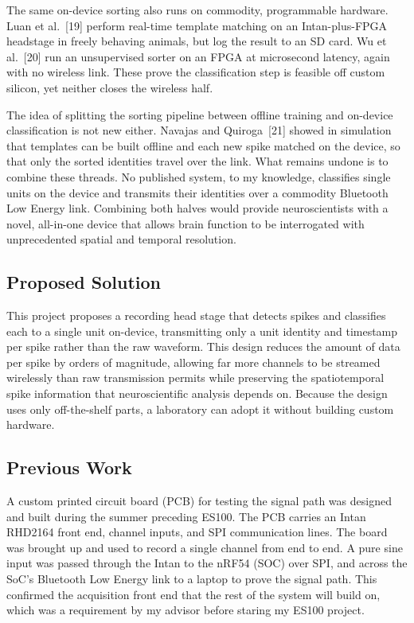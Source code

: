 \documentclass[11pt]{article}
\begin{document}
The same on-device sorting also runs on commodity, programmable hardware. Luan et al.~[19]
perform real-time template matching on an Intan-plus-FPGA headstage in freely behaving
animals, but log the result to an SD card. Wu et al.~[20] run an unsupervised sorter on an
FPGA at microsecond latency, again with no wireless link. These prove the classification
step is feasible off custom silicon, yet neither closes the wireless half.

The idea of splitting the sorting pipeline between offline training and on-device
classification is not new either. Navajas and Quiroga~[21] showed in simulation that
templates can be built offline and each new spike matched on the device, so that only the
sorted identities travel over the link. What remains undone is to combine these threads.
No published system, to my knowledge, classifies single units on the device and transmits
their identities over a commodity Bluetooth Low Energy link. Combining both halves would
provide neuroscientists with a novel, all-in-one device that allows brain function to be
interrogated with unprecedented spatial and temporal resolution.

\subsection{Proposed Solution}
This project proposes a recording head stage that detects spikes and classifies each to a
single unit on-device, transmitting only a unit identity and timestamp per spike
rather than the raw waveform. This design reduces the amount of data per spike by orders
of magnitude, allowing far more channels to be streamed wirelessly than raw transmission
permits while preserving the spatiotemporal spike information that neuroscientific analysis
depends on. Because the design uses only off-the-shelf parts, a laboratory can adopt it
without building custom hardware.

\subsection{Previous Work}
A custom printed circuit board (PCB) for testing the signal path was designed and built during the summer preceding ES100.
The PCB carries an Intan RHD2164 front end, channel inputs, and SPI communication lines. The board was brought up and used 
to record a single channel from end to end. A pure sine input was passed through the Intan to the nRF54 (SOC) over SPI, 
and across the SoC's Bluetooth Low Energy link to a laptop to prove the signal path. This confirmed the acquisition front 
end that the rest of the system will build on, which was a requirement by my advisor before staring my ES100 project. 
\end{document}

